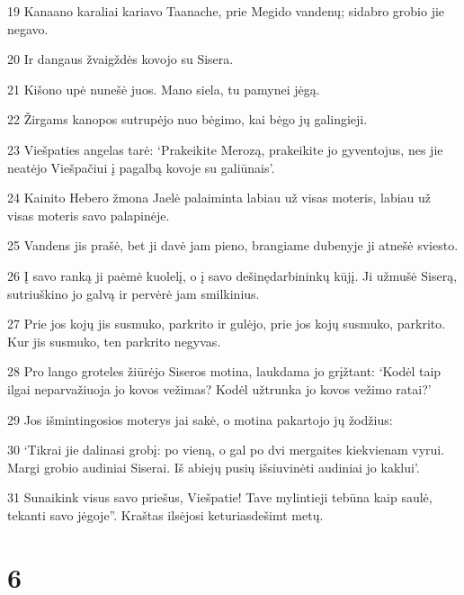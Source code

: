 \par 19 Kanaano karaliai kariavo Taanache, prie Megido vandenų; sidabro grobio jie negavo. 
\par 20 Ir dangaus žvaigždės kovojo su Sisera. 
\par 21 Kišono upė nunešė juos. Mano siela, tu pamynei jėgą. 
\par 22 Žirgams kanopos sutrupėjo nuo bėgimo, kai bėgo jų galingieji. 
\par 23 Viešpaties angelas tarė: ‘Prakeikite Merozą, prakeikite jo gyventojus, nes jie neatėjo Viešpačiui į pagalbą kovoje su galiūnais’. 
\par 24 Kainito Hebero žmona Jaelė palaiminta labiau už visas moteris, labiau už visas moteris savo palapinėje. 
\par 25 Vandens jis prašė, bet ji davė jam pieno, brangiame dubenyje ji atnešė sviesto. 
\par 26 Į savo ranką ji paėmė kuolelį, o į savo dešinę­darbininkų kūjį. Ji užmušė Siserą, sutriuškino jo galvą ir pervėrė jam smilkinius. 
\par 27 Prie jos kojų jis susmuko, parkrito ir gulėjo, prie jos kojų susmuko, parkrito. Kur jis susmuko, ten parkrito negyvas. 
\par 28 Pro lango groteles žiūrėjo Siseros motina, laukdama jo grįžtant: ‘Kodėl taip ilgai neparvažiuoja jo kovos vežimas? Kodėl užtrunka jo kovos vežimo ratai?’ 
\par 29 Jos išmintingosios moterys jai sakė, o motina pakartojo jų žodžius: 
\par 30 ‘Tikrai jie dalinasi grobį: po vieną, o gal po dvi mergaites kiekvienam vyrui. Margi grobio audiniai Siserai. Iš abiejų pusių išsiuvinėti audiniai jo kaklui’. 
\par 31 Sunaikink visus savo priešus, Viešpatie! Tave mylintieji tebūna kaip saulė, tekanti savo jėgoje”. Kraštas ilsėjosi keturiasdešimt metų.



\chapter{6}


